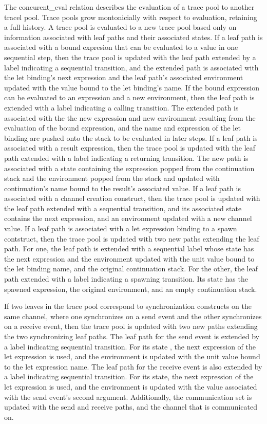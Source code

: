\documentclass{article}
\begin{document}
The concurent\_eval relation describes the evaluation of a trace pool to another tracel pool.
Trace pools grow montonicially with respect to evaluation, retaining a full history.  A trace
pool is evaluated to a new trace pool based only on information associated with leaf paths and
their associated states.  If a leaf path is associated with a bound expresion that can be
evaluated to a value in one sequential step, then the trace pool is updated with the leaf path
extended by a label indicating a sequential transition, and the extended path is associated
with the let binding's next expression and the leaf path's associated environment updated with
the value bound to the let binding's name.  If the bound expression can be evaluated to an
expression and a new environment, then the leaf path is extended with a label indicating a
calling transition.  The extended path is associated with the the new expression and new
environment resulting from the evaluation of the bound expression, and the name and expression
of the let binding are pushed onto the stack to be evaluated in later steps.  If a leaf path is
associated with a result expression, then the trace pool is updated with the leaf path extended
with a label indicating a returning transition.  The new path is associated with a state
containing the expression popped from the continuation stack and the environment popped from
the stack and updated with continuation's name bound to the result's associated value.  If a
leaf path is associated with a channel creation construct, then the trace pool is updated with
the leaf path extended with a sequential transition, and its associated state contains the next
expression, and an environment updated with a new channel value.  If a leaf path is associated
with a let expression binding to a spawn contstruct, then the trace pool is updated with two
new paths extending the leaf path.  For one, the leaf path is extended with a sequential label
whose state has the next expression and the environment updated with the unit value bound to
the let binding name, and the original continuation stack. For the other, the leaf path
extended with a label indicating a spawning transition.  Its state has the spawned expression,
the original environment, and an empty continuation stack. 

If two leaves in the trace pool correspond to synchronization constructs on the same channel,
where one synchronizes on a send event and the other synchronizes on a receive event, then the
trace pool is updated with two new paths extending the two synchronizing leaf paths.  The leaf
path for the send event is extended by a label indicating sequential transition.  For its state
, the next expression of the let expression is used, and the environment is updated with the
unit value bound to the let expression name.  The leaf path for the receive event is also
extended by a label indicating sequential transition.  For its state, the next expression of
the let expression is used, and the environment is updated with the value associated with the
send event's second argument.   Additionally, the communication set is updated with the send
and receive paths, and the channel that is communicated on. 
\end{document}
